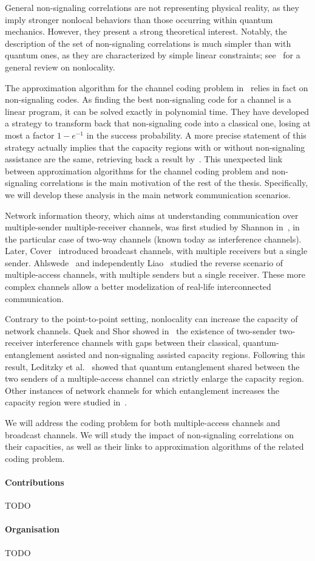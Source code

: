 General non-signaling correlations are not representing physical reality, as they imply stronger nonlocal behaviors than those occurring within quantum mechanics. However, they present a strong theoretical interest. Notably, the description of the set of non-signaling correlations is much simpler than with quantum ones, as they are characterized by simple linear constraints; see~\cite{BCPSW14} for a general review on nonlocality.

The approximation algorithm for the channel coding problem in~\cite{BF18} relies in fact on non-signaling codes. As finding the best non-signaling code for a channel is a linear program, it can be solved exactly in polynomial time. They have developed a strategy to transform back that non-signaling code into a classical one, losing at most a factor $1-e^{-1}$ in the success probability. A more precise statement of this strategy actually implies that the capacity regions with or without non-signaling assistance are the same, retrieving back a result by~\cite{Matthews12}. This unexpected link between approximation algorithms for the channel coding problem and non-signaling correlations is the main motivation of the rest of the thesis. Specifically, we will develop these analysis in the main network communication scenarios.

Network information theory, which aims at understanding communication over multiple-sender multiple-receiver channels, was first studied by Shannon in~\cite{Shannon61}, in the particular case of two-way channels (known today as interference channels). Later, Cover~\cite{Cover72} introduced broadcast channels, with multiple receivers but a single sender. Ahlswede~\cite{Ahlswede73} and independently Liao~\cite{Liao73} studied the reverse scenario of multiple-access channels, with multiple senders but a single receiver. These more complex channels allow a better modelization of real-life interconnected communication.

Contrary to the point-to-point setting, nonlocality can increase the capacity of network channels. Quek and Shor showed in~\cite{QS17} the existence of two-sender two-receiver interference channels with gaps between their classical, quantum-entanglement assisted and non-signaling assisted capacity regions. Following this result, Leditzky et al.~\cite{LALS20,SLSS22} showed that quantum entanglement shared between the two senders of a multiple-access channel can strictly enlarge the capacity region. Other instances of network channels for which entanglement increases the capacity region were studied in~\cite{Noetzel20,ND20}.

We will address the coding problem for both multiple-access channels and broadcast channels. We will study the impact of non-signaling correlations on their capacities, as well as their links to approximation algorithms of the related coding problem.

\paragraph{Contributions} TODO

\paragraph{Organisation} TODO
